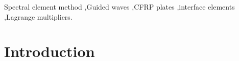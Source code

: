 \documentclass[preprint,12pt]{elsarticle}
\begin{document}
\begin{frontmatter}
		\begin{keyword}
			Spectral element method \sep Guided waves \sep CFRP plates \sep interface elements \sep Lagrange multipliers.
			
			
		\end{keyword}
		
	\end{frontmatter}
	
	
	\section{Introduction}
\end{document}
